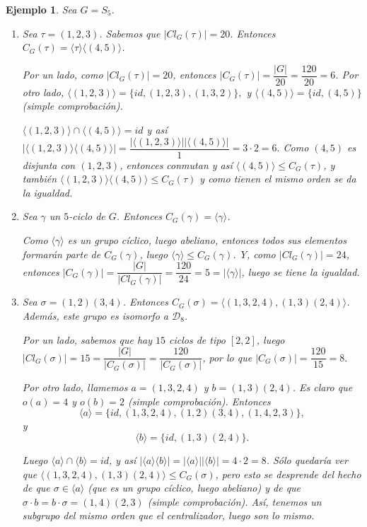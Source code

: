 \documentclass[12pt]{article}
\newtheorem{example}{Ejemplo}[theorem]
\begin{document}
\begin{example}\label{eq:excentra} Sea $G = S_{5}$.
\begin{enumerate}
\item Sea $\tau = (1,2,3)$. Sabemos que $|Cl_{G}(\tau)| = 20$. Entonces $C_{G}(\tau) = \langle \tau \rangle \langle (4,5) \rangle$.

Por un lado, como $|Cl_{G}(\tau)| = 20$, entonces $|C_{G}(\tau)| = \dfrac{|G|}{20} = \dfrac{120}{20} = 6$. Por otro lado, $\langle (1,2,3) \rangle = \lbrace id, (1,2,3), (1,3,2) \rbrace,$ y $\langle (4,5)\rangle = \lbrace id, (4,5) \rbrace $ (simple comprobación). 

$\langle (1,2,3) \rangle \cap \langle (4,5) \rangle = id$ y así $|\langle (1,2,3) \rangle \langle (4,5) \rangle| = \dfrac{|\langle (1,2,3) \rangle||\langle (4,5) \rangle|}{1} = 3 \cdot 2 = 6.$ Como $(4,5)$ es disjunta con $(1,2,3)$, entonces conmutan y así $\langle (4,5) \rangle \leq C_{G}(\tau)$, y también $\langle (1,2,3) \rangle \langle (4,5) \rangle \leq C_{G}(\tau)$ y como tienen el mismo orden se da la igualdad.
\item Sea $\gamma$ un $5$-ciclo de $G$. Entonces $C_{G}(\gamma) = \langle \gamma \rangle$. 

Como $\langle \gamma \rangle$ es un grupo cíclico, luego abeliano, entonces todos sus elementos formarán parte de $C_{G}(\gamma)$, luego $\langle \gamma \rangle \leq C_{G}(\gamma)$. Y, como $|Cl_{G}(\gamma)| = 24$, entonces $|C_{G}(\gamma)| = \dfrac{|G|}{|Cl_{G}(\gamma)|} = \dfrac{120}{24} = 5 = |\langle \gamma \rangle |$, luego se tiene la igualdad. 
\item Sea $\sigma = (1,2)(3,4)$. Entonces $C_{G}(\sigma) = \langle (1,3,2,4),(1,3)(2,4)\rangle$. Además, este grupo es isomorfo a $\mathcal{D}_{8}$. 

Por un lado, sabemos que hay $15$ ciclos de tipo $[2,2]$, luego $|Cl_{G}(\sigma)|=15 = \dfrac{|G|}{|C_{G}(\sigma)|} = \dfrac{120}{|C_{G}(\sigma)|}$, por lo que $|C_{G}(\sigma)| = \dfrac{120}{15}=8.$

Por otro lado, llamemos $a = (1,3,2,4)$ y $b = (1,3)(2,4)$. Es claro que $o(a) = 4$ y $o(b)=2$ (simple comprobación). Entonces $$\langle a \rangle = \lbrace id, (1,3,2,4), (1,2)(3,4), (1,4,2,3) \rbrace,$$ y $$\langle b \rangle = \lbrace id, (1,3)(2,4) \rbrace.$$

Luego $\langle a \rangle \cap \langle b \rangle = id$, y así $|\langle a \rangle \langle b \rangle | = |\langle a \rangle| |\langle b \rangle| = 4\cdot 2 = 8$. Sólo quedaría ver que $\langle (1,3,2,4),(1,3)(2,4)\rangle \leq C_{G}(\sigma)$, pero esto se desprende del hecho de que $\sigma \in \langle a \rangle$ (que es un grupo cíclico, luego abeliano) y de que $\sigma \cdot b = b \cdot \sigma = (1,4)(2,3)$ (simple comprobación). Así, tenemos un subgrupo del mismo orden que el centralizador, luego son lo mismo.
\end{enumerate}
\end{example}
\end{document}
